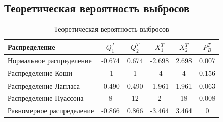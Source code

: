 \documentclass[../body.tex]{subfiles}
\begin{document}
\subsection{Теоретическая вероятность выбросов}
\begin{table}[H]
	\begin{center}
		\begin{tabular}{ l  c  c  c  c  c }
			\hline
			Распределение    & $Q_1^T$ & $Q_2^T$ & $X_1^T$ & $X_2^T$ & $P_B^T$ \\ \hline
			Нормальное распределение & -0.674 & 0.674 & -2.698 & 2.698 & 0.007 \\ 
			Распределение Коши & -1 & 1 & -4 & 4 & 0.156 \\ 
			Распределение Лапласа & -0.490 & 0.490 & -1.961 & 1.961 & 0.063 \\ 
			Распределение Пуассона & 8 & 12 & 2 & 18 & 0.008 \\ 
			Равномерное распределение & -0.866 & 0.866 & -3.464 & 3.464 & 0 \\   \hline
		\end{tabular}
		\caption{Теоретическая вероятность выбросов}
		\label{tab:theor}
	\end{center}
\end{table}
\end{document}

